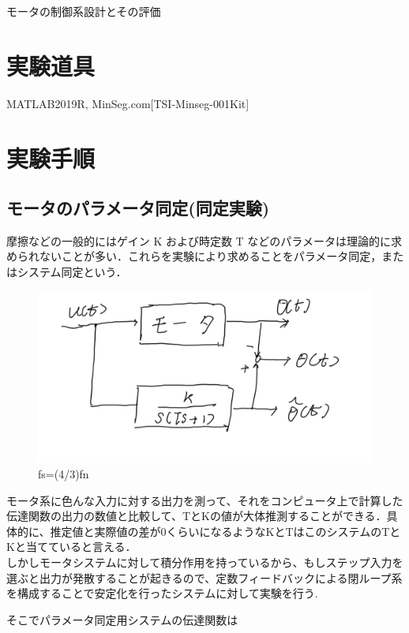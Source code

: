 \documentclass[xelatex,ja=standard,jafont=noto]{bxjsarticle}
\numberwithin{figure}{section}
\begin{document}
モータの制御系設計とその評価


\section{実験道具}

MATLAB2019R, MinSeg.com[TSI-Minseg-001Kit]

\section{実験手順}

\subsection{モータのパラメータ同定(同定実験)}
摩擦などの一般的にはゲイン K および時定数 T などのパラメータは理論的に求められないことが多い．これらを実験により求めることをパラメータ同定，またはシステム同定という．\\

\begin{figure}[h!]
    \centering
    \includegraphics[scale=0.3]{019.png}
    \caption{fs=(4/3)fn}
\end{figure}

モータ系に色んな入力に対する出力を測って、それをコンピュータ上で計算した伝達関数の出力の数値と比較して、TとKの値が大体推測することができる．具体的に、推定値と実際値の差が0くらいになるようなKとTはこのシステムのTとKと当てていると言える．\\


しかしモータシステムに対して積分作用を持っているから、もしステップ入力を選ぶと出力が発散することが起きるので、定数フィードバックによる閉ループ系を構成することで安定化を行ったシステムに対して実験を行う. 

\newpage

そこでパラメータ同定用システムの伝達関数は
\end{document}
